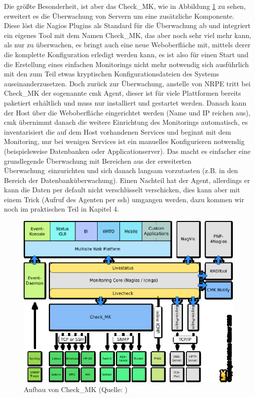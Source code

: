 \documentclass[12pt,a4paper,parskip,listof=totoc,bibliography=totoc]{scrreprt}
\begin{document}
	Die größte Besonderheit, ist aber das Check\_MK, wie in Abbildung \ref{fig:checkmkaufbau} zu sehen, erweitert es die Überwachung von Servern um eine zusätzliche Komponente. Diese löst die Nagios Plugins als Standard für die Überwachung ab und integriert ein eigenes Tool mit dem Namen Check\_MK, das aber noch sehr viel mehr kann, als nur zu überwachen, es bringt auch eine neue Weboberfläche mit, mittels derer die komplette Konfiguration erledigt werden kann, es ist also für einen Start und die Erstellung eines einfachen Monitorings nicht mehr notwendig sich ausführlich mit den zum Teil etwas kryptischen Konfigurationsdateien des Systems auseinanderzusetzen. Doch zurück zur Überwachung, anstelle von NRPE tritt bei Check\_MK der sogenannte \acrlong{cmk} Agent, dieser ist für viele Plattformen bereits paketiert erhältlich und muss nur installiert und gestartet werden. Danach kann der Host über die Weboberfläche eingerichtet werden (Name und IP reichen aus), \acrlong{cmk} übernimmt danach die weitere Einrichtung des Monitorings automatisch, es inventarisiert die auf dem Host vorhandenen Services und beginnt mit dem Monitoring, nur bei wenigen Services ist ein manuelles Konfigurieren notwendig (beispielsweise Datenbanken oder Applicationserver). Das macht es einfacher eine grundlegende Überwachung mit Bereichen aus der \glqq erweiterten Überwachung\grqq\ einzurichten und sich danach langsam vorzutasten (z.B. in den Bereich der Datenbanküberwachung). Einen Nachteil hat der Agent, allerdings er kann die Daten per default nicht verschlüsselt verschicken, dies kann aber mit einem Trick (Aufruf des Agenten per ssh) umgangen werden, dazu kommen wir noch im praktischen Teil in Kapitel 4.
	\begin{figure}
		\centering
		\includegraphics[width=1\textwidth]{pics/OMD_Schema.eps}
		\caption[Aufbau von Check\_MK]{Aufbau von Check\_MK (Quelle: \cite{checkmk})}
		\label{fig:checkmkaufbau}
	\end{figure}
	\clearpage
\end{document}
